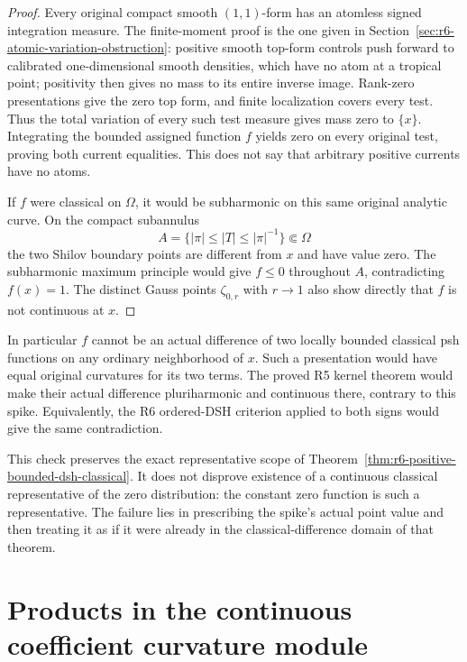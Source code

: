 \documentclass[11pt,a4paper]{article}
\numberwithin{equation}{section}
\theoremstyle{definition}
\theoremstyle{remark}
\begin{document}
\begin{proof}
Every original compact smooth $(1,1)$-form has an atomless signed
integration measure. The finite-moment proof is the one given in
Section~\ref{sec:r6-atomic-variation-obstruction}: positive smooth
top-form controls push forward to calibrated one-dimensional smooth
densities, which have no atom at a tropical point; positivity then
gives no mass to its entire inverse image. Rank-zero presentations
give the zero top form, and finite localization covers every test.
Thus the total variation of every such test measure gives mass zero
to $\{x\}$. Integrating the bounded assigned function $f$ yields
zero on every original test, proving both current equalities. This
does not say that arbitrary positive currents have no atoms.

If $f$ were classical on $\Omega$, it would be subharmonic on this
same original analytic curve. On the compact subannulus
\[
              A=\{|\pi|\le|T|\le|\pi|^{-1}\}\Subset\Omega
\]
the two Shilov boundary points are different from $x$ and have
value zero. The subharmonic maximum principle would give $f\le0$
throughout $A$, contradicting $f(x)=1$. The distinct Gauss points
$\zeta_{0,r}$ with $r\to1$ also show directly that $f$ is not
continuous at $x$.
\end{proof}

In particular $f$ cannot be an actual difference of two locally
bounded classical psh functions on any ordinary neighborhood of
$x$. Such a presentation would have equal original curvatures for
its two terms. The proved R5 kernel theorem would make their actual
difference pluriharmonic and continuous there, contrary to this
spike. Equivalently, the R6 ordered-DSH criterion applied to both
signs would give the same contradiction.

This check preserves the exact representative scope of
Theorem~\ref{thm:r6-positive-bounded-dsh-classical}. It does not
disprove existence of a continuous classical representative of the
zero distribution: the constant zero function is such a
representative. The failure lies in prescribing the spike's actual
point value and then treating it as if it were already in the
classical-difference domain of that theorem.



\section{Products in the continuous coefficient curvature module}
\label{sec:r6-continuous-curvature-module-products}
\end{document}
